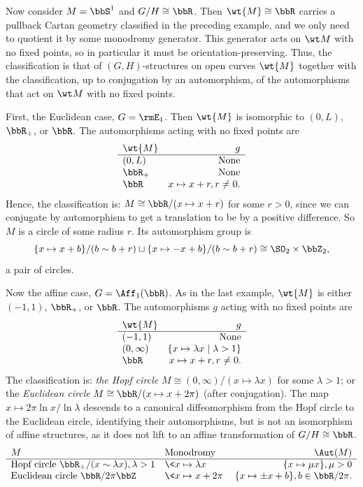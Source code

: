 \begin{example}\label{ex uniformization of closed curves}
    Now consider $M=\bbS^1$ and $G\slash H\cong \bbR$. Then $\wt{M}\cong\bbR$ carries a pullback Cartan geometry classified in the preceding example, and we only need to quotient it by some monodromy generator. This generator acts on $\wt M$ with no fixed points, so in particular it must be orientation-preserving. Thus, the classification is that of $(G,H)$-structures on open curves $\wt{M}$ together with the classification, up to conjugation by an automorphism, of the automorphisms that act on $\wt M$ with no fixed points.

    First, the Euclidean case, $G=\rmE_1$. Then $\wt{M}$ is isomorphic to $(0,L)$, $\bbR_+$, or $\bbR$. The automorphisms acting with no fixed points are 
    \[\begin{array}{lr}
        \wt{M} & g  \\\hline
        (0,L) & \text{None}\\
        \bbR_+ & \text{None}\\
        \bbR & x\mapsto x+r,r\neq 0.
    \end{array}\]
    Hence, the classification is: $M\cong \bbR\slash (x\mapsto x+r)$ for some $r>0$, since we can conjugate by automorphism to get a translation to be by a positive difference. So $M$ is a circle of some radius $r$. Its automorphism group is 
    \[\{x\mapsto x+b\}\slash (b\sim b+r)\sqcup \{x\mapsto -x+b\}\slash (b\sim b+r)\cong \SO_2\times \bbZ_2,\]
    a pair of circles.

    Now the affine case, $G=\Aff_1(\bbR)$. As in the last example, $\wt{M}$ is either $(-1,1)$, $\bbR_+$, or $\bbR$. The automorphisms $g$ acting with no fixed points are 
    \[\begin{array}{lr}
        \wt{M} & g  \\\hline
        (-1,1) & \text{None}\\
        (0,\infty) & \{x\mapsto \lambda x\mid \lambda>1\}\\
        \bbR & x\mapsto x+r,r\neq 0.
    \end{array}\]
    The classification is: \emph{the Hopf circle} $M\cong (0,\infty)\slash (x\mapsto \lambda x)$ for some $\lambda>1$; or the \emph{Euclidean circle} $M\cong \bbR\slash (x\mapsto x+2\pi)$ (after conjugation). The map $x\mapsto 2\pi \ln x\slash \ln\lambda$ descends to a canonical diffeomorphism from the Hopf circle to the Euclidean circle, identifying their automorphisms, but is not an isomorphism of affine structures, as it does not lift to an affine transformation of $G\slash H \cong\bbR$.
    \[\begin{array}{llr}
        M & \text{Monodromy} & \Aut(M)\\\hline
        \text{Hopf circle } \bbR_+\slash (x\sim \lambda x),\lambda>1 & \<x\mapsto \lambda x\> & \{x\mapsto \mu x\},\mu>0 \\
        \text{Euclidean circle } \bbR\slash 2\pi \bbZ & \<x\mapsto x+2\pi\> & \{x\mapsto \pm x+b\}, b\in \bbR\slash 2\pi.
    \end{array}\]
\end{example}

